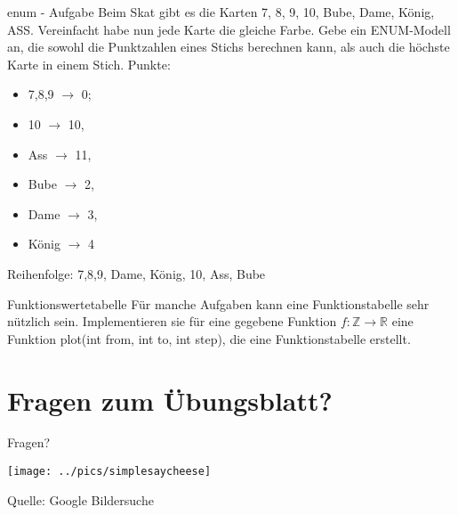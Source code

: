 \documentclass[18pt]{beamer}
\begin{document}
\begin{frame}{enum - Aufgabe}
Beim Skat gibt es die Karten 7, 8, 9, 10, Bube, Dame, König, ASS.
Vereinfacht habe nun jede Karte die gleiche Farbe. Gebe ein ENUM-Modell an,
die sowohl die Punktzahlen eines Stichs berechnen kann, als auch die höchste
Karte in einem Stich.
Punkte: 
\begin{itemize}
 \item 7,8,9 $\rightarrow$ 0; 
 \item 10 $\rightarrow$ 10, 
 \item Ass $\rightarrow$ 11, 
 \item Bube $\rightarrow$ 2, 
 \item Dame $\rightarrow$ 3, 
 \item König $\rightarrow$ 4
\end{itemize}

Reihenfolge: 7,8,9, Dame, König, 10, Ass, Bube
\end{frame}

\begin{frame}{Funktionswertetabelle}
 Für manche Aufgaben kann eine Funktionstabelle sehr nützlich sein.
 Implementieren sie für eine gegebene Funktion $f : \mathbb{Z} \to \mathbb{R}$
 eine Funktion plot(int from, int to, int step), die eine Funktionstabelle erstellt.
\end{frame}

\section{Fragen zum Übungsblatt?}
\begin{frame}{Fragen?}
\end{frame}



\begin{frame}
 \texttt{[image: ../pics/simplesaycheese]}
 
 \tiny{Quelle: Google Bildersuche}
\end{frame}
\end{document}
